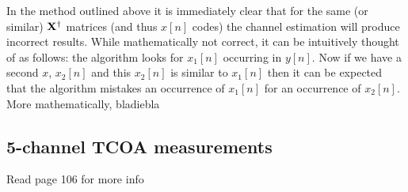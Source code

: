 \documentclass[11pt,titlepage]{report}
\begin{document}
In the method outlined above it is immediately clear that for the same (or similar) $\mathbf{X}^\dagger$ matrices (and thus $x[n]$ codes) the channel estimation will produce incorrect results. While mathematically not correct, it can be intuitively thought of as follows: the algorithm looks for $x_1[n]$ occurring in $y[n]$. Now if we have a second $x$, $x_2[n]$ and this $x_2[n]$ is similar to $x_1[n]$ then it can be expected that the algorithm mistakes an occurrence of $x_1[n]$ for an occurrence of $x_2[n]$. More mathematically, bladiebla

\subsection{5-channel TCOA measurements}
Read page 106 for more info
\end{document}
